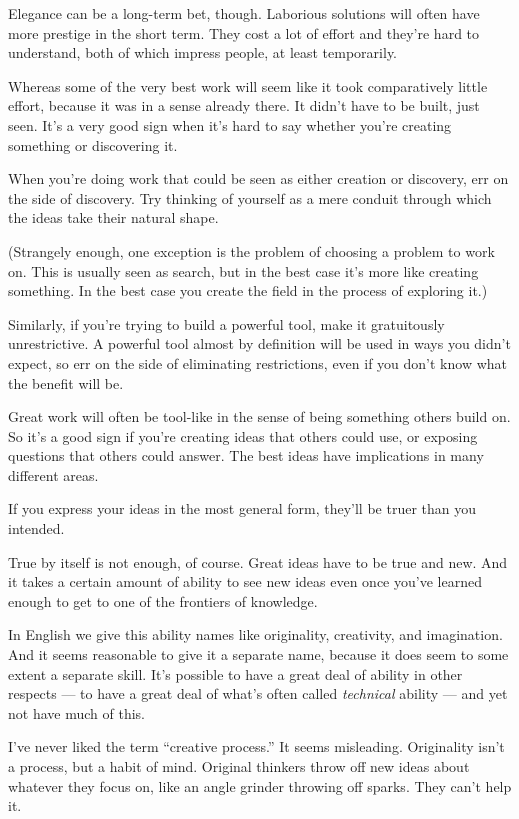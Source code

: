 Elegance can be a long-term bet, though. Laborious solutions will often
have more prestige in the short term. They cost a lot of effort and
they're hard to understand, both of which impress people, at least
temporarily.

Whereas some of the very best work will seem like it took comparatively
little effort, because it was in a sense already there. It didn't have
to be built, just seen. It's a very good sign when it's hard to say
whether you're creating something or discovering it.

When you're doing work that could be seen as either creation or
discovery, err on the side of discovery. Try thinking of yourself as a
mere conduit through which the ideas take their natural shape.

(Strangely enough, one exception is the problem of choosing a problem to
work on. This is usually seen as search, but in the best case it's more
like creating something. In the best case you create the field in the
process of exploring it.)

Similarly, if you're trying to build a powerful tool, make it
gratuitously unrestrictive. A powerful tool almost by definition will be
used in ways you didn't expect, so err on the side of eliminating
restrictions, even if you don't know what the benefit will be.

Great work will often be tool-like in the sense of being something
others build on. So it's a good sign if you're creating ideas that
others could use, or exposing questions that others could answer. The
best ideas have implications in many different areas.

If you express your ideas in the most general form, they'll be truer
than you intended.

True by itself is not enough, of course. Great ideas have to be true and
new. And it takes a certain amount of ability to see new ideas even once
you've learned enough to get to one of the frontiers of knowledge.

In English we give this ability names like originality, creativity, and
imagination. And it seems reasonable to give it a separate name, because
it does seem to some extent a separate skill. It's possible to have a
great deal of ability in other respects --- to have a great deal of
what's often called \emph{technical} ability --- and yet not have much
of this.

I've never liked the term ``creative process.'' It seems misleading.
Originality isn't a process, but a habit of mind. Original thinkers
throw off new ideas about whatever they focus on, like an angle grinder
throwing off sparks. They can't help it.

